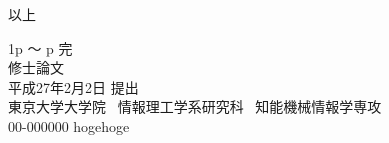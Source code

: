 \thispagestyle{empty}
\LARGE
\vspace*{2cm}
以上
\begin{center}
\vspace{4cm}
\Large
1p 〜 \pageref{bktitle}p 完\\
\vspace{1cm}
修士論文\\
\vspace{1cm}
平成27年2月2日 提出\\
\vspace{5cm}
\LARGE
東京大学大学院~
情報理工学系研究科~
知能機械情報学専攻\\
00-000000 hogehoge
\end{center}
\label{bktitle}
\normalsize
